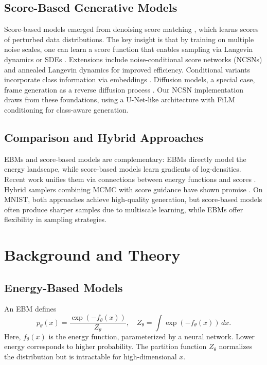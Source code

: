 \documentclass[a4paper,12pt]{article}
\begin{document}
\subsection{Score-Based Generative Models}
Score-based models emerged from denoising score matching \cite{vincent2011connection}, which learns scores of perturbed data distributions. The key insight is that by training on multiple noise scales, one can learn a score function that enables sampling via Langevin dynamics or SDEs \cite{song2019generative}. Extensions include noise-conditional score networks (NCSNs) \cite{song2020score} and annealed Langevin dynamics for improved efficiency. Conditional variants incorporate class information via embeddings \cite{dhariwal2021diffusion}. Diffusion models, a special case, frame generation as a reverse diffusion process \cite{ho2020denoising, song2020denoising}. Our NCSN implementation draws from these foundations, using a U-Net-like architecture with FiLM conditioning for class-aware generation.

\subsection{Comparison and Hybrid Approaches}
EBMs and score-based models are complementary: EBMs directly model the energy landscape, while score-based models learn gradients of log-densities. Recent work unifies them via connections between energy functions and scores \cite{song2021maximum}. Hybrid samplers combining MCMC with score guidance have shown promise \cite{du2022improved}. On MNIST, both approaches achieve high-quality generation, but score-based models often produce sharper samples due to multiscale learning, while EBMs offer flexibility in sampling strategies.

\section{Background and Theory}
\subsection{Energy-Based Models}
An EBM defines
\begin{equation}
    p_\theta(x) = \frac{\exp(-f_\theta(x))}{Z_\theta}, \quad Z_\theta = \int \exp(-f_\theta(x)) \, dx.
\end{equation}
Here, $f_\theta(x)$ is the energy function, parameterized by a neural network. Lower energy corresponds to higher probability. The partition function $Z_\theta$ normalizes the distribution but is intractable for high-dimensional $x$.
\end{document}
